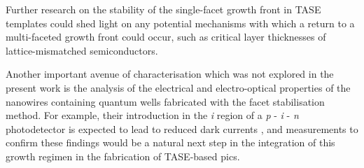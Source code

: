 Further research on the stability of the single-facet growth front in \acs{TASE} templates could shed light on any potential mechanisms with which a return to a multi-faceted growth front could occur, such as critical layer thicknesses of lattice-mismatched semiconductors.

Another important avenue of characterisation which was not explored in the present work is the analysis of the electrical and electro-optical properties of the nanowires containing quantum wells fabricated with the facet stabilisation method. For example, their introduction in the \textit{i} region of a \textit{p} - \textit{i} - \textit{n} photodetector is expected to lead to reduced dark currents \cite{Xue2021}, and measurements to confirm these findings would be a natural next step in the integration of this growth regimen in the fabrication of \acs{TASE}-based \acs{pic}s.